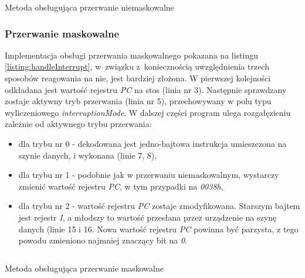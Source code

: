 \begin{listing}[h]
	\inputminted{java}{listings/z80emu-core/handleNmiInterrupt.java}
	\caption{Metoda obsługująca przerwanie niemaskowalne}
	\label{listing:handleNmiInterrupt}
\end{listing}

\subsubsection{Przerwanie maskowalne}
Implementacja obsługi przerwania maskowalnego pokazana na listingu \ref{listing:handleInterrupt}, w~związku z~koniecznością uwzględnienia trzech sposobów reagowania na nie, jest bardziej złożona. W pierwszej kolejności odkładana jest wartość rejestru \emph{PC} na stos (linia nr 3). Następnie sprawdzany zostaje aktywny tryb przerwania (linia nr 5), przechowywany w polu typu wyliczeniowego \emph{interruptionMode}. W dalszej części program ulega rozgałęzieniu zależnie od aktywnego trybu przerwania:
\begin{itemize}  
    \item dla trybu nr 0 - dekodowana jest jedno-bajtowa instrukcja umieszczona na szynie danych, i wykonana (linie 7, 8),
    \item dla trybu nr 1 - podobnie jak w przerwaniu niemaskowalnym, wystarczy zmienić wartość rejestru \emph{PC}, w tym przypadki na \emph{0038h},
    \item dla trybu nr 2 - wartość rejestru \emph{PC} zostaje zmodyfikowana. Starszym bajtem jest rejestr \emph{I}, a młodszy to wartość przesłana przez urządzenie na szynę danych (linie 15 i 16. Nowa wartość rejestru \emph{PC} powinna być parzysta, z tego powodu zmieniono najmniej znaczący bit na \emph{0}.
\end{itemize}


\begin{listing}[h]
	\inputminted{java}{listings/z80emu-core/handleInterrupt.java}
	\caption{Metoda obsługująca przerwanie maskowalne}
	\label{listing:handleInterrupt}
\end{listing}

